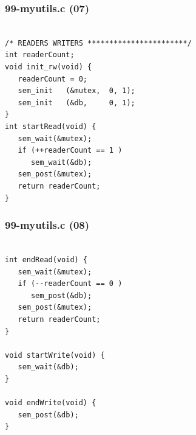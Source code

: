 \documentclass[aspectratio=169, xcolor=table, notheorems, hyperref={pdfpagelabels=false}]{beamer}
\begin{document}
\begin{frame}[fragile]
\frametitle{99-myutils.c (07)}
\begin{lstlisting}[basicstyle=\ttfamily\large]        %  54

/* READERS WRITERS ***********************/
int readerCount;
void init_rw(void) {
   readerCount = 0;
   sem_init   (&mutex,  0, 1);
   sem_init   (&db,     0, 1);
}
int startRead(void) {
   sem_wait(&mutex);
   if (++readerCount == 1 )
      sem_wait(&db);
   sem_post(&mutex);
   return readerCount;
} 

\end{lstlisting}
\end{frame}

\begin{frame}[fragile]
\frametitle{99-myutils.c (08)}
\begin{lstlisting}[basicstyle=\ttfamily\large]        %  54

int endRead(void) {
   sem_wait(&mutex);
   if (--readerCount == 0 )
      sem_post(&db);
   sem_post(&mutex);
   return readerCount;
} 

void startWrite(void) {
   sem_wait(&db);
}

void endWrite(void) {
   sem_post(&db);
}

\end{lstlisting}
\end{frame}

\end{document}
